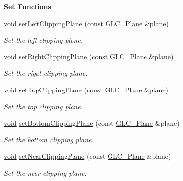 \begin{Indent}{\bf Set Functions}\par
\begin{DoxyCompactItemize}
\item 
\hyperlink{group___u_a_v_objects_plugin_ga444cf2ff3f0ecbe028adce838d373f5c}{void} \hyperlink{class_g_l_c___frustum_a1eccff54ff8a66191404a72298fb11b1}{set\-Left\-Clipping\-Plane} (const \hyperlink{class_g_l_c___plane}{G\-L\-C\-\_\-\-Plane} \&plane)
\begin{DoxyCompactList}\small\item\em Set the left clipping plane. \end{DoxyCompactList}\item 
\hyperlink{group___u_a_v_objects_plugin_ga444cf2ff3f0ecbe028adce838d373f5c}{void} \hyperlink{class_g_l_c___frustum_a163e5e06d713109b43822761e5708656}{set\-Right\-Clipping\-Plane} (const \hyperlink{class_g_l_c___plane}{G\-L\-C\-\_\-\-Plane} \&plane)
\begin{DoxyCompactList}\small\item\em Set the right clipping plane. \end{DoxyCompactList}\item 
\hyperlink{group___u_a_v_objects_plugin_ga444cf2ff3f0ecbe028adce838d373f5c}{void} \hyperlink{class_g_l_c___frustum_af9cd37e77997d668e0fcac7a813e396c}{set\-Top\-Clipping\-Plane} (const \hyperlink{class_g_l_c___plane}{G\-L\-C\-\_\-\-Plane} \&plane)
\begin{DoxyCompactList}\small\item\em Set the top clipping plane. \end{DoxyCompactList}\item 
\hyperlink{group___u_a_v_objects_plugin_ga444cf2ff3f0ecbe028adce838d373f5c}{void} \hyperlink{class_g_l_c___frustum_ab4e5b0fe389956ee8ada0339fda99453}{set\-Bottom\-Clipping\-Plane} (const \hyperlink{class_g_l_c___plane}{G\-L\-C\-\_\-\-Plane} \&plane)
\begin{DoxyCompactList}\small\item\em Set the bottom clipping plane. \end{DoxyCompactList}\item 
\hyperlink{group___u_a_v_objects_plugin_ga444cf2ff3f0ecbe028adce838d373f5c}{void} \hyperlink{class_g_l_c___frustum_aea27c1fc3c92f828e45865fb823cae1b}{set\-Near\-Clipping\-Plane} (const \hyperlink{class_g_l_c___plane}{G\-L\-C\-\_\-\-Plane} \&plane)
\begin{DoxyCompactList}\small\item\em Set the near clipping plane. \end{DoxyCompactList}\item 

\end{DoxyCompactItemize}
\end{Indent}
